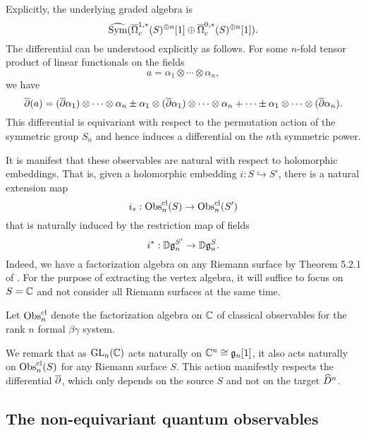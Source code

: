 Explicitly, the underlying graded algebra is
\[
\widehat{{\rm Sym}}(\overline{\Omega}^{1,*}_c(S)^{\oplus n}[1] \oplus \overline{\Omega}^{0,*}_c(S)^{\oplus n}[1]).
\]
The differential can be understood explicitly as follows.
For some $n$-fold tensor product of linear functionals on the fields
\[
a = \alpha_1 \otimes \cdots \otimes \alpha_n,
\]
we have
\[
\overline{\partial}(a) = (\overline{\partial} \alpha_1) \otimes \cdots \otimes \alpha_n \pm \alpha_1 \otimes (\overline{\partial} \alpha_1) \otimes \cdots \otimes \alpha_n + \cdots \pm\alpha_1 \otimes \cdots \otimes (\overline{\partial} \alpha_n).
\]
This differential is equivariant with respect to the permutation action of the symmetric group $S_n$ and 
hence induces a differential on the $n$th symmetric power.

It is manifest that these observables are natural with respect to holomorphic embeddings.
That is, given a holomorphic embedding $i: S \hookrightarrow S'$,
there is a natural extension map
\[
i_*: {\rm Obs}^{\rm cl}_n(S) \to {\rm Obs}^{\rm cl}_n(S')
\]
that is naturally induced by the restriction map of fields
\[
i^*: \mathbb D\mathfrak{g}_n^{S'} \to \mathbb D\mathfrak{g}_n^{S}.
\]
Indeed, we have a factorization algebra on any Riemann surface by Theorem 5.2.1 of \cite{CG1}.
For the purpose of extracting the vertex algebra, it will suffice to focus on $S = \mathbb C$ and not consider all Riemann surfaces at the same time.

\begin{dfn}
Let ${\rm Obs}^{\rm cl}_n$ denote the factorization algebra on $\mathbb C$ of classical observables for the rank $n$ formal $\beta\gamma$ system.
\end{dfn}

We remark that as ${\rm GL}_n(\mathbb C)$ acts naturally on $\mathbb C^n \cong \mathfrak{g}_n[1]$,
it also acts naturally on ${\rm Obs}^{\rm cl}_n(S)$ for any Riemann surface $S$.
This action manifestly respects the differential $\overline{\partial}$, 
which only depends on the source $S$ and not on the target $\widehat{D}^n$.

\subsection{The non-equivariant quantum observables}

